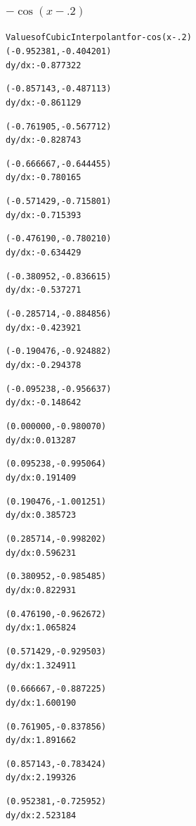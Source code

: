 \documentclass[11pt]{article} %
\begin{document}
\subsubsection*{$-\cos(x-.2)$}
\begin{alltt}
 Values of Cubic Interpolant for -cos(x-.2)
(-0.952381, -0.404201)
 dy/dx:	-0.877322

(-0.857143, -0.487113)
 dy/dx:	-0.861129

(-0.761905, -0.567712)
 dy/dx:	-0.828743

(-0.666667, -0.644455)
 dy/dx:	-0.780165

(-0.571429, -0.715801)
 dy/dx:	-0.715393

(-0.476190, -0.780210)
 dy/dx:	-0.634429

(-0.380952, -0.836615)
 dy/dx:	-0.537271

(-0.285714, -0.884856)
 dy/dx:	-0.423921

(-0.190476, -0.924882)
 dy/dx:	-0.294378

(-0.095238, -0.956637)
 dy/dx:	-0.148642

(0.000000, -0.980070)
 dy/dx:	0.013287

(0.095238, -0.995064)
 dy/dx:	0.191409

(0.190476, -1.001251)
 dy/dx:	0.385723

(0.285714, -0.998202)
 dy/dx:	0.596231

(0.380952, -0.985485)
 dy/dx:	0.822931

(0.476190, -0.962672)
 dy/dx:	1.065824

(0.571429, -0.929503)
 dy/dx:	1.324911

(0.666667, -0.887225)
 dy/dx:	1.600190

(0.761905, -0.837856)
 dy/dx:	1.891662

(0.857143, -0.783424)
 dy/dx:	2.199326

(0.952381, -0.725952)
 dy/dx:	2.523184
\end{alltt}
\end{document}

